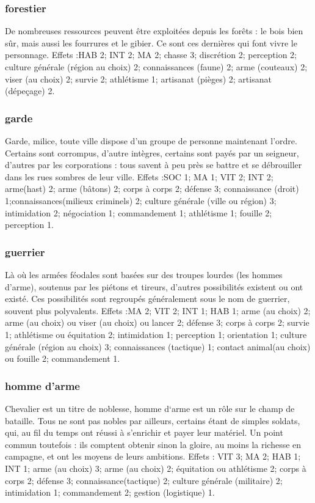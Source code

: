 \documentclass[10pt,a4paper,twocolumn]{book}
\begin{document}
\subsubsection{forestier}
De nombreuses ressources peuvent être exploitées depuis les forêts : le bois bien sûr, mais aussi les fourrures et le gibier. Ce sont ces dernières qui font vivre le personnage.
Effets :HAB 2; INT 2; MA 2; chasse 3; discrétion 2; perception 2; culture générale (région au choix) 2; connaissances (faune) 2; arme (couteaux) 2; viser (au choix) 2; survie 2; athlétisme 1; artisanat (pièges) 2; artisanat (dépeçage) 2.
\subsubsection{garde}
Garde, milice, toute ville dispose d’un groupe de personne maintenant l’ordre. Certains sont corrompus, d’autre intègres, certains sont payés par un seigneur, d’autres par les corporations : tous savent à peu près se battre et se débrouiller dans les rues sombres de leur ville.
Effets :SOC 1; MA 1; VIT 2; INT 2; arme(hast) 2; arme (bâtons) 2; corps à corps 2; défense 3; connaissance (droit) 1;connaissances(milieux criminels) 2; culture générale (ville ou région) 3; intimidation 2; négociation 1; commandement 1; athlétisme 1; fouille 2; perception 1.
\subsubsection{guerrier}
Là où les armées féodales sont basées sur des troupes lourdes (les hommes d’arme), soutenus par les piétons et tireurs, d’autres possibilités existent ou ont existé. Ces possibilités sont regroupés généralement sous le nom de guerrier, souvent plus polyvalents.
Effets :MA 2; VIT 2; INT 1; HAB 1; arme (au choix) 2; arme (au choix) ou viser (au choix) ou lancer 2; défense 3; corps à corps 2; survie 1; athlétisme ou équitation 2; intimidation 1; perception 1; orientation 1; culture générale (région au choix) 3; connaissances (tactique) 1; contact animal(au choix) ou fouille 2; commandement 1. 
\subsubsection{homme d’arme}
Chevalier est un titre de noblesse, homme d‘arme est un rôle sur le champ de bataille. Tous ne sont pas nobles par ailleurs, certains étant de simples soldats, qui, au fil du temps ont réussi à s’enrichir et payer leur matériel. Un point commun toutefois : ils comptent obtenir sinon la gloire, au moins la richesse en campagne, et ont les moyens de leurs ambitions.
Effets : VIT 3; MA 2; HAB 1; INT 1; arme (au choix) 3; arme (au choix) 2; équitation ou athlétisme 2; corps à corps 2; défense 3; connaissance(tactique) 2; culture générale (militaire) 2; intimidation 1; commandement 2; gestion (logistique) 1.
\end{document}
